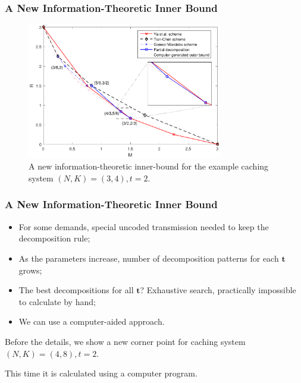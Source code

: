\documentclass{beamer}
\begin{document}
\begin{frame}
\frametitle{A New Information-Theoretic Inner Bound}
\begin{figure}[]
\centering
\includegraphics[width=8.5cm]{plot34.pdf}
\caption{\label{fig:system}A new information-theoretic inner-bound for the example caching system $(N,K)=(3,4), t=2$.}
\end{figure}
\end{frame}

\begin{frame}
\frametitle{A New Information-Theoretic Inner Bound}
\begin{itemize}
\item For some demands, special uncoded transmission needed to keep the decomposition rule;
\item As the parameters increase, number of decomposition patterns for each $\boldsymbol{t}$ grows; 
\item The best decompositions for all $\boldsymbol{t}$? Exhaustive search, practically impossible to calculate by hand;
\item We can use a computer-aided approach.
\end{itemize}
Before the details, we show a new corner point for caching system $(N,K)=(4,8), t=2$.
\vspace{20pt}

\centering
This time it is calculated using a computer program.
\end{frame}
\end{document}
